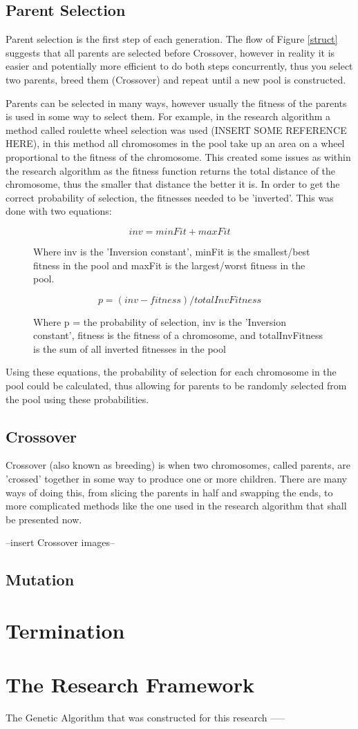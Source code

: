\subsection{Parent Selection}
\par
Parent selection is the first step of each generation. The flow of Figure \ref{struct} suggests that all parents are selected before Crossover, however in reality it is easier and potentially more efficient to do both steps concurrently, thus you select two parents, breed them (Crossover) and repeat until a new pool is constructed.
\par
Parents can be selected in many ways, however usually the fitness of the parents is used in some way to select them. For example, in the research algorithm a method called roulette wheel selection was used (INSERT SOME REFERENCE HERE), in this method all chromosomes in the pool take up an area on a wheel proportional to the fitness of the chromosome. This created some issues as within the research algorithm as the fitness function returns the total distance of the chromosome, thus the smaller that distance the better it is. In order to get the correct probability of selection, the fitnesses needed to be 'inverted'. This was done with two equations: 
\begin{figure}
\[ inv = minFit + maxFit\]
\caption{Where inv is the 'Inversion constant', minFit is the smallest/best fitness in the pool and maxFit is the largest/worst fitness in the pool.}
\end{figure}
\begin{figure}
\[ p = (inv - fitness)/totalInvFitness\]
\caption{Where p = the probability of selection, inv is the 'Inversion constant', fitness is the fitness of a chromosome, and totalInvFitness is the sum of all inverted fitnesses in the pool}
\end{figure}
Using these equations, the probability of selection for each chromosome in the pool could be calculated, thus allowing for parents to be randomly selected from the pool using these probabilities.
\subsection{Crossover}
\par
Crossover (also known as breeding) is when two chromosomes, called parents, are 'crossed' together in some way to produce one or more children. There are many ways of doing this, from slicing the parents in half and swapping the ends, to more complicated methods like the one used in the research algorithm that shall be presented now.

--insert Crossover images--

\subsection{Mutation}
\par
\section{Termination}
\par
\section{The Research Framework}
\par
The Genetic Algorithm that was constructed for this research -----

